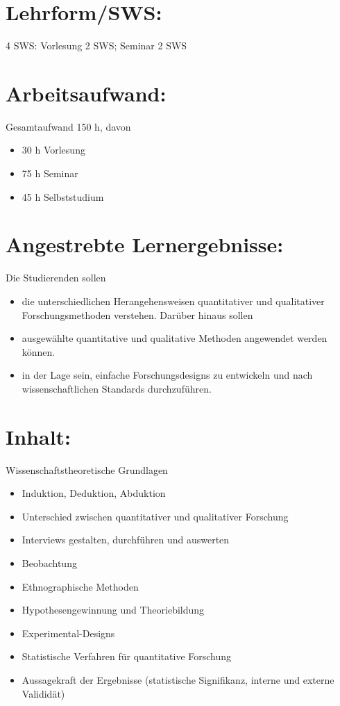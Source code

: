 \section{Lehrform/SWS:}\label{lehrformsws-21}

4 SWS: Vorlesung 2 SWS; Seminar 2 SWS

\section{Arbeitsaufwand:}\label{arbeitsaufwand-21}

Gesamtaufwand 150 h, davon

\begin{itemize}
\tightlist
\item
  30 h Vorlesung
\item
  75 h Seminar
\item
  45 h Selbststudium
\end{itemize}

\section{Angestrebte
Lernergebnisse:}\label{angestrebte-lernergebnisse-21}

Die Studierenden sollen

\begin{itemize}
\tightlist
\item
  die unterschiedlichen Herangehensweisen quantitativer und qualitativer
  Forschungsmethoden verstehen. Darüber hinaus sollen
\item
  ausgewählte quantitative und qualitative Methoden angewendet werden
  können.
\item
  in der Lage sein, einfache Forschungsdesigns zu entwickeln und nach
  wissenschaftlichen Standards durchzuführen.
\end{itemize}

\section{Inhalt:}\label{inhalt-21}

Wissenschaftstheoretische Grundlagen

\begin{itemize}
\tightlist
\item
  Induktion, Deduktion, Abduktion
\item
  Unterschied zwischen quantitativer und qualitativer Forschung
\item
  Interviews gestalten, durchführen und auswerten
\item
  Beobachtung
\item
  Ethnographische Methoden
\item
  Hypothesengewinnung und Theoriebildung
\item
  Experimental-Designs
\item
  Statistische Verfahren für quantitative Forschung
\item
  Aussagekraft der Ergebnisse (statistische Signifikanz, interne und
  externe Valididät)
\end{itemize}

